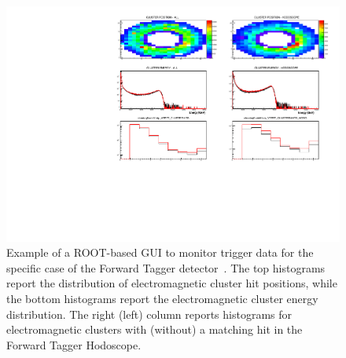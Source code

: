 \begin{figure}[t]
	\includegraphics[width=1.0\columnwidth]{img/plotAndrea.pdf}
	\caption{Example of a ROOT-based GUI to monitor trigger data for the specific case of the Forward Tagger
        detector~\cite{ft-ref}. The top histograms report the distribution of electromagnetic cluster hit positions, while
        the bottom histograms report the electromagnetic cluster energy distribution. The right (left) column reports
        histograms for electromagnetic clusters  with (without) a matching hit in the Forward Tagger Hodoscope.}
	\label{fig:plot_andrea}
\end{figure}
